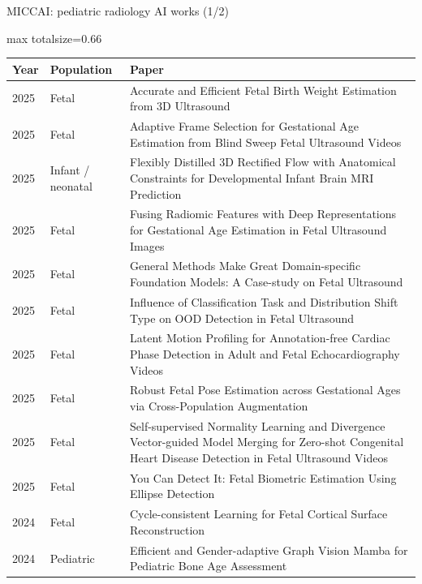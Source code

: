\documentclass[aspectratio=169]{beamer}
\renewcommand{\arraystretch}{1.08}
\begin{document}
\begin{frame}[category=Conferences]{MICCAI: pediatric radiology AI works (1/2)}
\vspace{2pt}
\tiny
\begin{adjustbox}{max totalsize={\textwidth}{0.66\textheight}}
\renewcommand{\arraystretch}{1.2}
\begin{tabular}{|l|l|>{\raggedright\arraybackslash}p{}|}
\hline \textbf{Year} & \textbf{Population} & \textbf{Paper} \\ \hline
2025 & Fetal & Accurate and Efficient Fetal Birth Weight Estimation from 3D Ultrasound \\ \hline
2025 & Fetal & Adaptive Frame Selection for Gestational Age Estimation from Blind Sweep Fetal Ultrasound Videos \\ \hline
2025 & Infant / neonatal & Flexibly Distilled 3D Rectified Flow with Anatomical Constraints for Developmental Infant Brain MRI Prediction \\ \hline
2025 & Fetal & Fusing Radiomic Features with Deep Representations for Gestational Age Estimation in Fetal Ultrasound Images \\ \hline
2025 & Fetal & General Methods Make Great Domain-specific Foundation Models: A Case-study on Fetal Ultrasound \\ \hline
2025 & Fetal & Influence of Classification Task and Distribution Shift Type on OOD Detection in Fetal Ultrasound \\ \hline
2025 & Fetal & Latent Motion Profiling for Annotation-free Cardiac Phase Detection in Adult and Fetal Echocardiography Videos \\ \hline
2025 & Fetal & Robust Fetal Pose Estimation across Gestational Ages via Cross-Population Augmentation \\ \hline
2025 & Fetal & Self-supervised Normality Learning and Divergence Vector-guided Model Merging for Zero-shot Congenital Heart Disease Detection in Fetal Ultrasound Videos \\ \hline
2025 & Fetal & You Can Detect It: Fetal Biometric Estimation Using Ellipse Detection \\ \hline
2024 & Fetal & Cycle-consistent Learning for Fetal Cortical Surface Reconstruction \\ \hline
2024 & Pediatric & Efficient and Gender-adaptive Graph Vision Mamba for Pediatric Bone Age Assessment \\ \hline

\end{tabular}
\end{adjustbox}
\end{frame}
\end{document}
